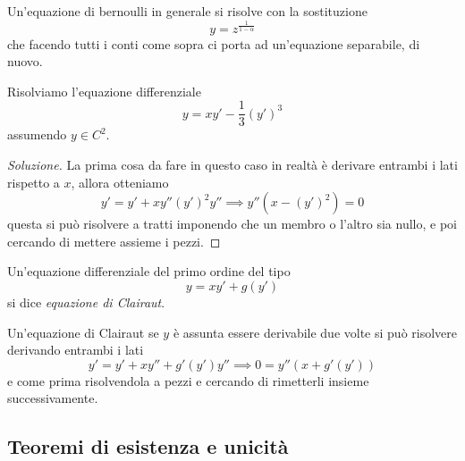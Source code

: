 \documentclass[11pt]{scrartcl}
\begin{document}
	Un'equazione di bernoulli in generale si risolve con la sostituzione
	$$y=z^{\frac{1}{1-\alpha}}$$
	che facendo tutti i conti come sopra ci porta ad un'equazione separabile, di nuovo.
	\begin{example}
		Risolviamo l'equazione differenziale 
		$$y=xy'-\frac{1}{3}\left(y'\right)^3$$
		assumendo $y\in C^2$.
	\end{example}
	\begin{proof}[Soluzione]
		La prima cosa da fare in questo caso in realtà è derivare entrambi i lati rispetto a $x$, allora otteniamo
		$$y'=y'+xy''\left(y'\right)^2y'' \implies y''(x-(y')^2)=0$$
		questa si può risolvere a tratti imponendo che un membro o l'altro sia nullo, e poi cercando di mettere assieme i pezzi.
	\end{proof}
	\begin{definition}
		Un'equazione differenziale del primo ordine del tipo
		$$y=xy'+g(y')$$
		si dice \textit{equazione di Clairaut}.
	\end{definition}
	Un'equazione di Clairaut se $y$ è assunta essere derivabile due volte si può risolvere derivando entrambi i lati
	$$y'=y'+xy''+g'(y')y'' \implies 0=y''(x+g'(y'))$$
	e come prima risolvendola a pezzi e cercando di rimetterli insieme successivamente.
	
	\subsection{Teoremi di esistenza e unicità}
	
\end{document}
